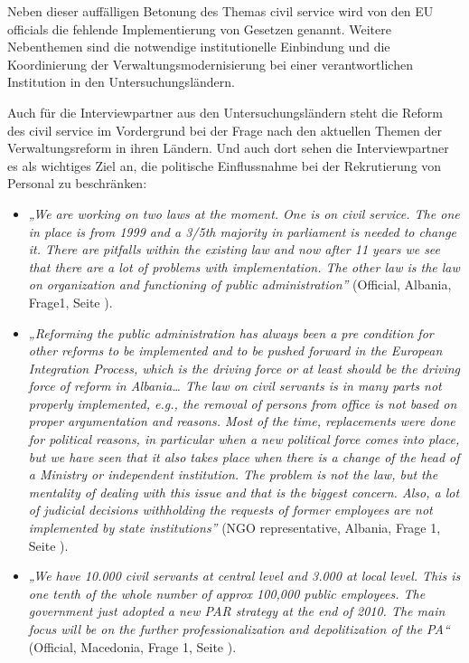 Neben dieser auffälligen Betonung des Themas civil service wird von den EU officials die fehlende Implementierung von Gesetzen genannt. Weitere Nebenthemen sind die notwendige institutionelle Einbindung und die Koordinierung der Verwaltungsmodernisierung bei einer verantwortlichen Institution in den Untersuchungsländern.\par
Auch für die Interviewpartner aus den Untersuchungsländern steht die Reform des civil service im Vordergrund bei der Frage nach den aktuellen Themen der Verwaltungsreform in ihren Ländern. Und auch dort sehen die Interviewpartner es als wichtiges Ziel an, die politische Einflussnahme bei der Rekrutierung von Personal zu beschränken:
\begin{itemize}[label={}]
\item \textit{„We are working on two laws at the moment. One is on civil service. The one in place is from 1999 and a 3/5th majority in parliament is needed to change it. There are pitfalls within the existing law and now after 11 years we see that there are a lot of problems with implementation. The other law is the law on organization and functioning of public administration”} (Official, Albania, Frage1, Seite \pageref{sec:par macedonia}).
\item \textit{„Reforming the public administration has always been a pre condition for other reforms to be implemented and to be pushed forward in the European Integration Process, which is the driving force or at least should be the driving force of reform in Albania… The law on civil servants is in many parts not properly implemented, e.g., the removal of persons from office is not based on proper argumentation and reasons. Most of the time, replacements were done for political reasons, in particular when a new political force comes into place, but we have seen that it also takes place when there is a change of the head of a Ministry or independent institution. The problem is not the law, but the mentality of dealing with this issue and that is the biggest concern. Also, a lot of judicial decisions withholding the requests of former employees are not implemented by state institutions”} (NGO representative, Albania, Frage 1, Seite \pageref{sec:par macedonia}).
\item \textit{„We have 10.000 civil servants at central level and 3.000 at local level. This is one tenth of the whole number of approx 100,000 public employees. The government just adopted a new PAR strategy at the end of 2010. The main focus will be on the further professionalization and depolitization of the PA“} (Official, Macedonia, Frage 1, Seite \pageref{sec:par macedonia}).

\end{itemize}
